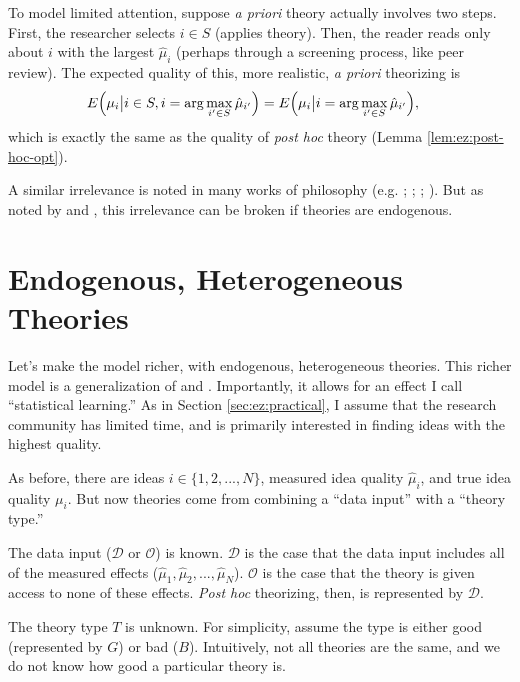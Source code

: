 \documentclass[12pt,english]{article}
\theoremstyle{plain}
\theoremstyle{plain}
\begin{document}
To model limited attention, suppose \emph{a priori} theory actually involves two steps. First, the researcher selects $i\in S $
(applies theory). Then, the reader reads only about $i$ with the largest $\hat{\mu}_{i}$ (perhaps through a screening process, like peer review). The expected quality of this, more realistic, \emph{a priori} theorizing is
\begin{align}
E\Bigl(\mu_{i}\big|i\in S ,i=\arg\max_{i'\in S }\hat{\mu}_{i'}\Bigr) 
& =
E\Bigl(\mu_{i}\big|i=\arg\max_{i'\in S }\hat{\mu}_{i'}\Bigr),
\end{align}
which is exactly the same as the quality of \emph{post hoc} theory (Lemma \ref{lem:ez:post-hoc-opt}).

A similar irrelevance is noted in many works of philosophy (e.g. \citet{hempel1966philosophy}; \citet{lakatos1970methodology}; \citet{rosenkrantz1977inference}; \citet{gardner1982predicting}).  But as noted by \citet{maher1988prediction} and \citet{kahn1996positive}, this irrelevance can be broken if theories are endogenous.

\section{Endogenous, Heterogeneous Theories}\label{sec:het}

Let's make the model richer, with endogenous, heterogeneous theories. This richer model is a generalization of \citet{maher1988prediction} and \citet{kahn1996positive}. Importantly, it allows for an effect I call ``statistical learning.'' As in Section \ref{sec:ez:practical}, I assume that the research community has limited time, and is primarily interested in finding ideas with the highest quality.

As before, there are ideas $i\in \{1,2,...,N\}$, measured idea quality $\hat{\mu}_{i}$, and true idea quality $\mu_{i}$. But now  theories come from combining a ``data input'' with a ``theory type.''  

The data input ($\mathcal{D}$ or $\mathcal{O}$) is  known. $\mathcal{D}$ is the case that the data input includes all of the measured effects ($\hat{\mu}_{1},\hat{\mu}_{2},...,\hat{\mu}_{N}$). $\mathcal{O}$ is the case that the theory is given access to none of these effects. \emph{Post hoc} theorizing, then, is represented by $\mathcal{D}$. 

The theory type $T$ is unknown. For simplicity, assume the type is either good (represented by $G$) or bad ($B$). Intuitively, not all theories are the same, and we do not know how good a particular theory is.
\end{document}
